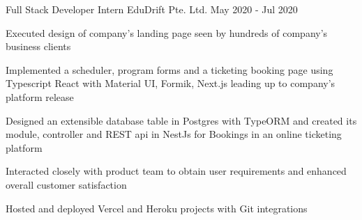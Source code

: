 \begin{cventries}
  \cventry
    {Full Stack Developer Intern} %
    {EduDrift Pte. Ltd.} %
    {} %
    {May 2020 - Jul 2020} %
    {
      \begin{cvitems} %
        \item {Executed design of company's landing page seen by hundreds of company's business clients}
        \item {Implemented a scheduler, program forms and a ticketing booking page using Typescript React with Material UI, Formik, Next.js leading up to company's platform release}
        \item {Designed an extensible database table in Postgres with TypeORM and created its module, controller and REST api in NestJs for Bookings in an online ticketing platform}
        \item {Interacted closely with product team to obtain user requirements and enhanced overall customer satisfaction}
        \item {Hosted and deployed Vercel and Heroku projects with Git integrations}
      \end{cvitems}
    }

\end{cventries}
